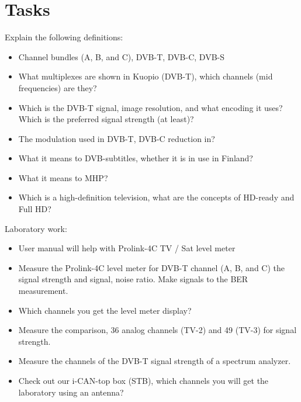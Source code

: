 \documentclass[english]{article}
\begin{document}
\section{Tasks}
 Explain the following definitions:
 \begin{itemize}
 \item Channel bundles (A, B, and C), DVB-T, DVB-C, DVB-S
 \item What multiplexes are shown in Kuopio (DVB-T), which channels (mid frequencies) are
they?
 \item Which is the DVB-T signal, image resolution, and what encoding it uses? Which is the
preferred signal strength (at least)?
 \item The modulation used in DVB-T, DVB-C reduction in?
 \item What it means to DVB-subtitles, whether it is in use in Finland?
 \item What it means to MHP?
 \item Which is a high-definition television, what are the concepts of HD-ready and Full HD?
 \end{itemize}
Laboratory work:
\begin{itemize}
\item User manual will help with Prolink-4C TV / Sat level meter
\item Measure the Prolink-4C level meter for DVB-T channel (A, B, and C) the signal strength
and signal, noise ratio. Make signals to the BER measurement.
\item Which channels you get the level meter display?
\item Measure the comparison, 36 analog channels (TV-2) and 49 (TV-3) for signal strength.
\item Measure the channels of the DVB-T signal strength of a spectrum analyzer.
\item Check out our i-CAN-top box (STB), which channels you will get the laboratory using an
antenna?
\end{itemize}
\end{document}
